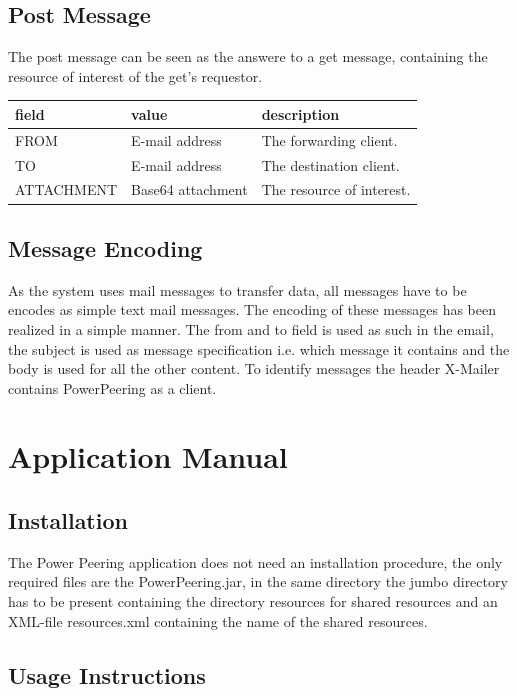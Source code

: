 \documentclass{article}
\begin{document}
\subsection{Post Message}
The post message can be seen as the answere to a get message, containing the
resource of interest of the get's requestor.
\newline
\noindent
\begin{tabular}{|lll|} 
\hline
field & value & description \\
\hline 
FROM & E-mail address & The forwarding client. \\
TO & E-mail address & The destination client. \\
ATTACHMENT & Base64 attachment & The resource of interest. \\
\hline 
\end{tabular}

\subsection{Message Encoding}
As the system uses mail messages to transfer data, all messages have to be
encodes as simple text mail messages. The encoding of these messages has been
realized in a simple manner. The from and to field is used as such in the
email, the subject is used as message specification i.e. which message it
contains and the body is used for all the other content. To identify messages
the header X-Mailer contains PowerPeering as a client.

\section{Application Manual}

\subsection{Installation}

The Power Peering application does not need an installation procedure, the only
required files are the PowerPeering.jar, in the same directory the jumbo
directory has to be present containing the directory resources for shared
resources and an XML-file resources.xml containing the name of the shared
resources.

\subsection{Usage Instructions}
\end{document}
